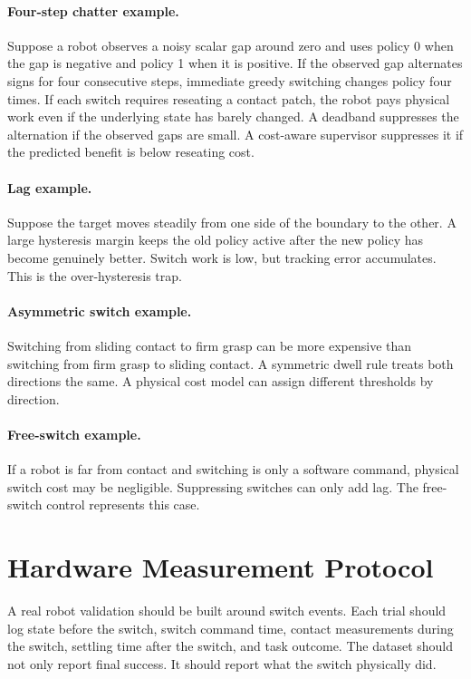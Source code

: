 \documentclass{article}
\begin{document}
\paragraph{Four-step chatter example.}
Suppose a robot observes a noisy scalar gap around zero and uses policy 0 when the gap is negative and policy 1 when it is positive.
If the observed gap alternates signs for four consecutive steps, immediate greedy switching changes policy four times.
If each switch requires reseating a contact patch, the robot pays physical work even if the underlying state has barely changed.
A deadband suppresses the alternation if the observed gaps are small.
A cost-aware supervisor suppresses it if the predicted benefit is below reseating cost.

\paragraph{Lag example.}
Suppose the target moves steadily from one side of the boundary to the other.
A large hysteresis margin keeps the old policy active after the new policy has become genuinely better.
Switch work is low, but tracking error accumulates.
This is the over-hysteresis trap.

\paragraph{Asymmetric switch example.}
Switching from sliding contact to firm grasp can be more expensive than switching from firm grasp to sliding contact.
A symmetric dwell rule treats both directions the same.
A physical cost model can assign different thresholds by direction.

\paragraph{Free-switch example.}
If a robot is far from contact and switching is only a software command, physical switch cost may be negligible.
Suppressing switches can only add lag.
The free-switch control represents this case.

\section{Hardware Measurement Protocol}

A real robot validation should be built around switch events.
Each trial should log state before the switch, switch command time, contact measurements during the switch, settling time after the switch, and task outcome.
The dataset should not only report final success.
It should report what the switch physically did.
\end{document}
